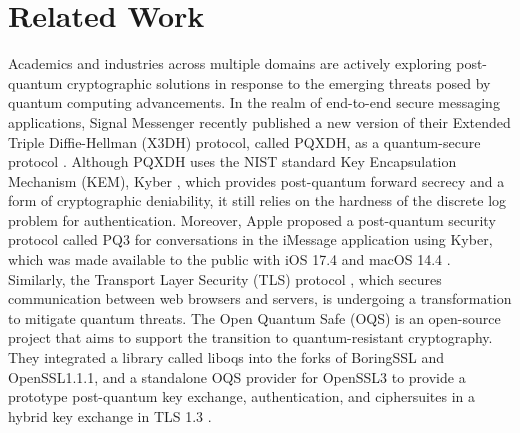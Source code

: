 \section{Related Work}
\label{Related Work}

Academics and industries across multiple domains are actively exploring post-quantum cryptographic solutions in response to the emerging threats posed by quantum computing advancements.
In the realm of end-to-end secure messaging applications, Signal Messenger recently published a new version of their Extended Triple Diffie-Hellman (X3DH) protocol, called PQXDH, as a quantum-secure protocol \citep{Signal_pqxdh}. 
Although PQXDH uses the NIST standard Key Encapsulation Mechanism (KEM), Kyber \citep{kyber}, which provides post-quantum forward secrecy and a form of cryptographic deniability, it still relies on the hardness of the discrete log problem for authentication. 
Moreover, Apple proposed a post-quantum security protocol called PQ3 for conversations in the iMessage application using Kyber, which was made available to the public with iOS 17.4 and macOS 14.4 \citep{Apple_pq3}.  
 Similarly, the Transport Layer Security (TLS) protocol \citep{TLS}, which secures communication between web browsers and servers, is undergoing a transformation to mitigate quantum threats.  
 The Open Quantum Safe (OQS) \citep{OQS_project} is an open-source project that aims to support the transition to quantum-resistant cryptography.  
 They integrated a library called liboqs into the forks of BoringSSL and OpenSSL1.1.1, and a standalone OQS provider for OpenSSL3 to provide a prototype post-quantum key exchange, authentication, and ciphersuites in a hybrid key exchange in TLS 1.3 \citep{hybrid_key_exchange_TLS_1.3}.  
 
